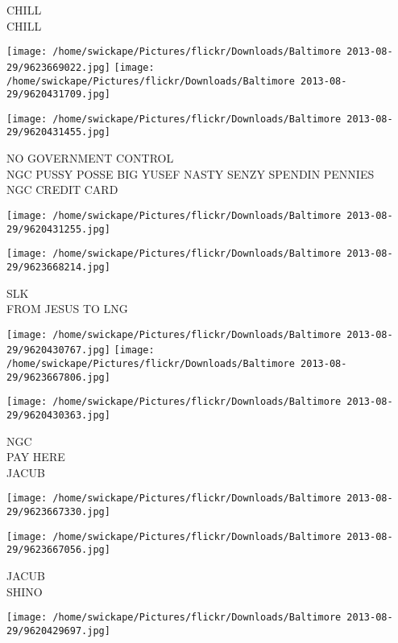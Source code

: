 \documentclass[10pt,letterpaper]{article}
\begin{document}
CHILL\\
CHILL\\
\pagebreak

\texttt{[image: /home/swickape/Pictures/flickr/Downloads/Baltimore 2013-08-29/9623669022.jpg]}
\texttt{[image: /home/swickape/Pictures/flickr/Downloads/Baltimore 2013-08-29/9620431709.jpg]}

\texttt{[image: /home/swickape/Pictures/flickr/Downloads/Baltimore 2013-08-29/9620431455.jpg]}

NO GOVERNMENT CONTROL\\
NGC PUSSY POSSE BIG YUSEF NASTY SENZY SPENDIN PENNIES\\
NGC CREDIT CARD\\
\pagebreak

\texttt{[image: /home/swickape/Pictures/flickr/Downloads/Baltimore 2013-08-29/9620431255.jpg]}

\vspace{0.25in}
\texttt{[image: /home/swickape/Pictures/flickr/Downloads/Baltimore 2013-08-29/9623668214.jpg]}

SLK\\
FROM JESUS TO LNG\\
\pagebreak

\texttt{[image: /home/swickape/Pictures/flickr/Downloads/Baltimore 2013-08-29/9620430767.jpg]}
\texttt{[image: /home/swickape/Pictures/flickr/Downloads/Baltimore 2013-08-29/9623667806.jpg]}

\vspace{0.25in}
\texttt{[image: /home/swickape/Pictures/flickr/Downloads/Baltimore 2013-08-29/9620430363.jpg]}

NGC\\
PAY HERE\\
JACUB\\
\pagebreak

\texttt{[image: /home/swickape/Pictures/flickr/Downloads/Baltimore 2013-08-29/9623667330.jpg]}

\vspace{0.25in}
\texttt{[image: /home/swickape/Pictures/flickr/Downloads/Baltimore 2013-08-29/9623667056.jpg]}

JACUB\\
SHINO\\
\pagebreak

\texttt{[image: /home/swickape/Pictures/flickr/Downloads/Baltimore 2013-08-29/9620429697.jpg]}
\end{document}
